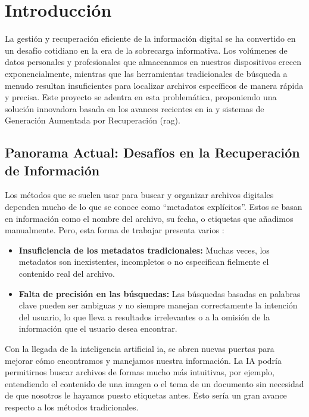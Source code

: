 
\chapter{Introducción}

La gestión y recuperación eficiente de la información digital se ha convertido en un desafío cotidiano en la era de la sobrecarga informativa. Los volúmenes de datos personales y profesionales que almacenamos en nuestros dispositivos crecen exponencialmente, mientras que las herramientas tradicionales de búsqueda a menudo resultan insuficientes para localizar archivos específicos de manera rápida y precisa. Este proyecto se adentra en esta problemática, proponiendo una solución innovadora basada en los avances recientes en \gls{ia} y sistemas de Generación Aumentada por Recuperación (\gls{rag}). \citep{thomas_janssen_build_2024}

\section{Panorama Actual: Desafíos en la Recuperación de Información}
Los métodos que se suelen usar para buscar y organizar archivos digitales dependen mucho de lo que se conoce como ``metadatos explícitos''. Estos se basan en información como el nombre del archivo, su fecha, o etiquetas que añadimos manualmente. Pero, esta forma de trabajar presenta varios \citep{coffey_fundamental_2000}:
\begin{itemize}
    \item \textbf{Insuficiencia de los metadatos tradicionales:} Muchas veces, los metadatos son inexistentes, incompletos o no especifican fielmente el contenido real del archivo.
    \item \textbf{Falta de precisión en las búsquedas:} Las búsquedas basadas en palabras clave pueden ser ambiguas y no siempre manejan correctamente la intención del usuario, lo que lleva a resultados irrelevantes o a la omisión de la información que el usuario desea encontrar.
\end{itemize}
Con la llegada de la inteligencia artificial \gls{ia}, se abren nuevas puertas para mejorar cómo encontramos y manejamos nuestra información. La IA podría permitirnos buscar archivos de formas mucho más intuitivas, por ejemplo, entendiendo el contenido de una imagen o el tema de un documento sin necesidad de que nosotros le hayamos puesto etiquetas antes. Esto sería un gran avance respecto a los métodos tradicionales.

